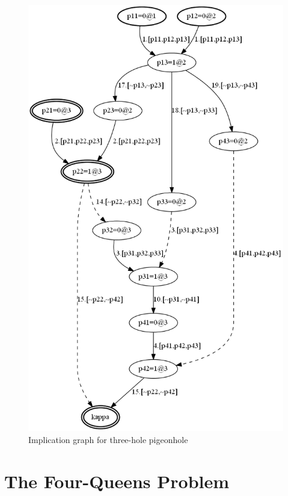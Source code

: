 \documentclass[11pt]{report}
\begin{document}
\begin{figure}
\begin{center}
\includegraphics[keepaspectratio=true,height=.9\textheight]{pigeon3-bw}
\end{center}
\caption{Implication graph for three-hole pigeonhole}\label{pigeon3}
\end{figure}

\clearpage

\chapter{The Four-Queens Problem}\label{ch.queens}
\end{document}
